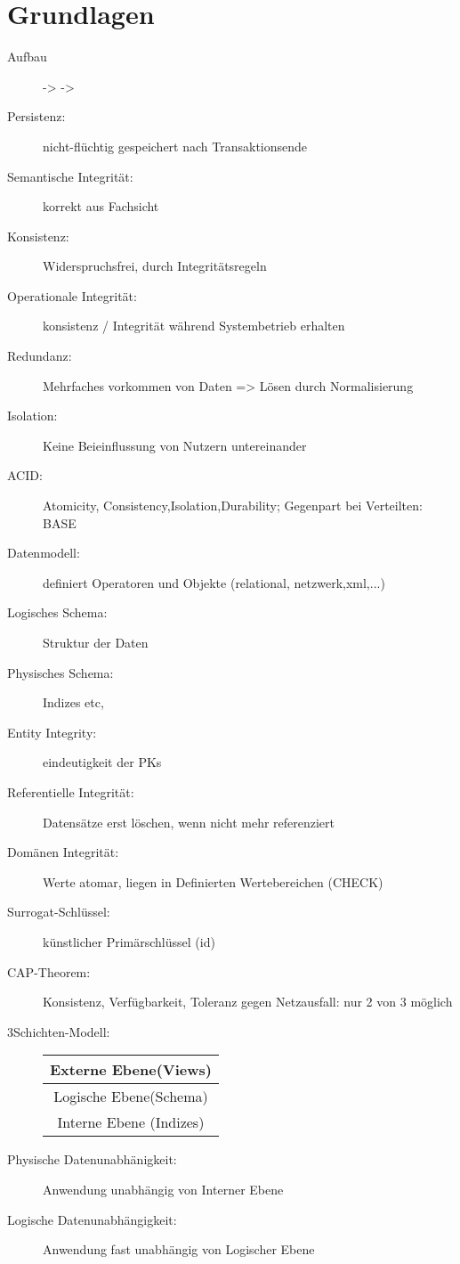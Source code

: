 \section{Grundlagen}

\begin{description}
\item[Aufbau]  ->  -> 
\item[Persistenz:] nicht-flüchtig gespeichert nach Transaktionsende
\item[Semantische Integrität:] korrekt aus Fachsicht 
\item[Konsistenz:] Widerspruchsfrei, durch Integritätsregeln
\item[Operationale Integrität:] konsistenz / Integrität während Systembetrieb erhalten
\item[Redundanz:] Mehrfaches vorkommen von Daten => Lösen durch Normalisierung
\item[Isolation:] Keine Beieinflussung von Nutzern untereinander
\item[ACID:] Atomicity, Consistency,Isolation,Durability; Gegenpart bei Verteilten: BASE
\item[Datenmodell:] definiert Operatoren und Objekte (relational, netzwerk,xml,...)
\item[Logisches Schema:] Struktur der Daten
\item[Physisches Schema:] Indizes etc,
\item[Entity Integrity:] eindeutigkeit der PKs
\item[Referentielle Integrität:] Datensätze erst löschen, wenn nicht mehr referenziert
\item[Domänen Integrität:] Werte atomar, liegen in Definierten Wertebereichen (CHECK)
\item[Surrogat-Schlüssel:] künstlicher Primärschlüssel (id)
\item[CAP-Theorem:] Konsistenz, Verfügbarkeit, Toleranz gegen Netzausfall: nur 2 von 3 möglich
\item[3Schichten-Modell:] \begin{minipage}{0.3\textwidth}
\begin{tabular}{|c|}
\hline
Externe Ebene(Views) \\\hline Logische Ebene(Schema) \\\hline Interne Ebene (Indizes)\\\hline
\end{tabular}\end{minipage}
\item[Physische Datenunabhänigkeit:] Anwendung unabhängig von Interner Ebene 
\item[Logische Datenunabhängigkeit:] Anwendung fast unabhängig von Logischer Ebene 
\end{description}


